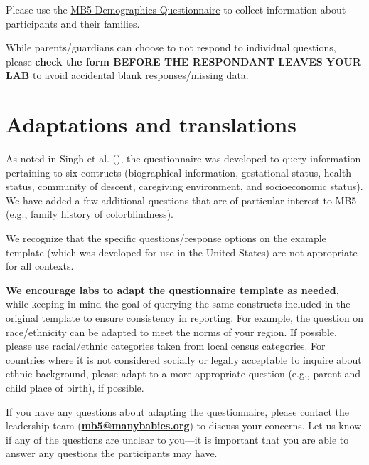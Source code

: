 \documentclass[
  letterpaper,
  DIV=11,
  numbers=noendperiod,
  oneside]{scrreprt}
\begin{document}
Please use the
\href{https://drive.google.com/drive/folders/1-3QWj7jg10KTWBsHqRPaRiqRwyHZfDD1?usp=sharing}{MB5
Demographics Questionnaire} to collect information about
participants and their families.

While parents/guardians can choose to not respond to individual
questions, please \textbf{check the form BEFORE THE RESPONDANT LEAVES
YOUR LAB} to avoid accidental blank responses/missing data.

\section{Adaptations and
translations}\label{adaptations-and-translations}

As noted in Singh et al. (), the
questionnaire was developed to query information pertaining to six
contructs (biographical information, gestational status, health status,
community of descent, caregiving environment, and socioeconomic status).
We have added a few additional questions that are of particular interest
to MB5 (e.g., family history of colorblindness).

We recognize that the specific questions/response options on the example
template (which was developed for use in the United States) are not
appropriate for all contexts.

\textbf{We encourage labs to adapt the questionnaire template as
needed}, while keeping in mind the goal of querying the same constructs
included in the original template to ensure consistency in reporting.
For example, the question on race/ethnicity can be adapted to meet the
norms of your region. If possible, please use racial/ethnic categories
taken from local census categories. For countries where it is not
considered socially or legally acceptable to inquire about ethnic
background, please adapt to a more appropriate question (e.g., parent
and child place of birth), if possible.

If you have any questions about adapting the questionnaire, please
contact the leadership team
(\href{mailto:mb5@manybabies.org}{\textbf{mb5@manybabies.org}}) to
discuss your concerns. Let us know if any of the questions are unclear
to you---it is important that you are able to answer any questions the
participants may have.
\end{document}
